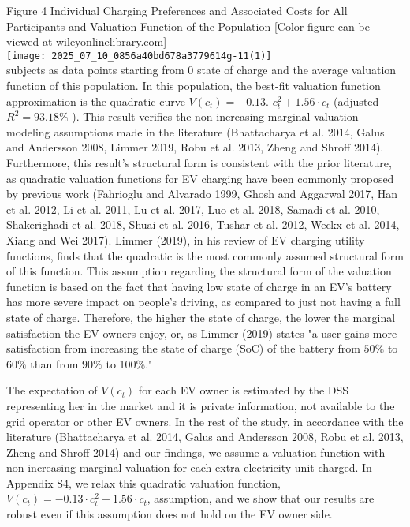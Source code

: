 \documentclass[10pt]{article}
\begin{document}
Figure 4 Individual Charging Preferences and Associated Costs for All Participants and Valuation Function of the Population [Color figure can be viewed at \href{http://wileyonlinelibrary.com}{wileyonlinelibrary.com}]\\
\texttt{[image: 2025\_07\_10\_0856a40bd678a3779614g-11(1)]}\\
subjects as data points starting from 0 state of charge and the average valuation function of this population. In this population, the best-fit valuation function approximation is the quadratic curve $V\left(c_{t}\right)=-0.13$. $c_{t}^{2}+1.56 \cdot c_{t}$ (adjusted $R^{2}=93.18 \%$ ). This result verifies the non-increasing marginal valuation modeling assumptions made in the literature (Bhattacharya et al. 2014, Galus and Andersson 2008, Limmer 2019, Robu et al. 2013, Zheng and Shroff 2014). Furthermore, this result's structural form is consistent with the prior literature, as quadratic valuation functions for EV charging have been commonly proposed by previous work (Fahrioglu and Alvarado 1999, Ghosh and Aggarwal 2017, Han et al. 2012, Li et al. 2011, Lu et al. 2017, Luo et al. 2018, Samadi et al. 2010, Shakerighadi et al. 2018, Shuai et al. 2016, Tushar et al. 2012, Weckx et al. 2014, Xiang and Wei 2017). Limmer (2019), in his review of EV charging utility functions, finds that the quadratic is the most commonly assumed structural form of this function. This assumption regarding the structural form of the valuation function is based on the fact that having low state of charge in an EV's battery has more severe impact on people's driving, as compared to just not having a full state of charge. Therefore, the higher the state of charge, the lower the marginal satisfaction the EV owners enjoy, or, as Limmer (2019) states "a user gains more satisfaction from increasing the state of charge (SoC) of the battery from $50 \%$ to $60 \%$ than from $90 \%$ to 100\%."

The expectation of $V\left(c_{t}\right)$ for each EV owner is estimated by the DSS representing her in the market and it is private information, not available to the grid operator or other EV owners. In the rest of the study, in accordance with the literature (Bhattacharya et al. 2014, Galus and Andersson 2008, Robu et al. 2013, Zheng and Shroff 2014) and our findings, we assume a valuation function with non-increasing marginal valuation for each extra electricity unit charged. In Appendix S4, we relax this quadratic valuation function, $V\left(c_{t}\right)=-0.13 \cdot c_{t}^{2}+1.56 \cdot c_{t}$, assumption, and we show that our results are robust even if this assumption does not hold on the EV owner side.
\end{document}
